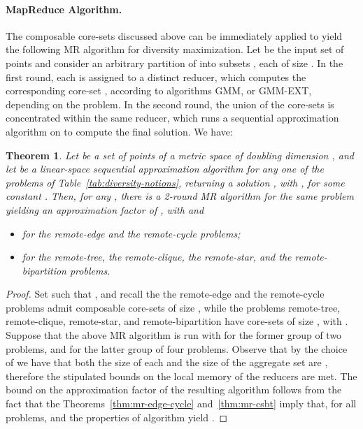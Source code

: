 \documentclass{article}
\newtheorem{theorem}{Theorem}
\begin{document}
\paragraph{MapReduce Algorithm.}  The composable core-sets discussed above
can be immediately applied to yield the following MR algorithm
for diversity maximization.  Let  be the input set of  points
and consider an arbitrary partition of  into  subsets , each of size . In the first round, each
 is assigned to a distinct reducer, which computes the
corresponding core-set , according to algorithms {\sc GMM}, or
{\sc GMM-EXT}, depending on the problem. In the second round, the
union of the  core-sets  is
concentrated within the same reducer, which runs a sequential
approximation algorithm on  to compute the final solution.
We have:
\begin{theorem} \label{thm-2-rounds} Let  be a set of  points of
  a metric space of doubling dimension , and let  be a
  linear-space sequential approximation algorithm for any one of the
  problems of Table~\ref{tab:diversity-notions}, returning a solution
  , with ,
  for some constant . Then, for any
  , there is a 2-round MR algorithm for the same
  problem yielding an approximation factor of , with
   and
  \begin{itemize}
  \item  for the remote-edge
    and the remote-cycle problems;
  \item  for the remote-tree,
    the remote-clique, the remote-star, and the remote-bipartition
    problems.
  \end{itemize}
\end{theorem}
\begin{proof}
Set  such that , and
recall the the remote-edge and the remote-cycle problems admit
composable core-sets of size , while the problems
remote-tree, remote-clique, remote-star, and remote-bipartition have
core-sets of size , with .  Suppose that
the above MR algorithm is run with  for the former
group of two problems, and  for the latter
group of four problems.  Observe that by the choice of  we have
that both the size of each  and the size of the aggregate set
 are , therefore the stipulated bounds on the local
memory of the reducers are met. The bound on the approximation factor
of the resulting algorithm follows from the fact that the
Theorems~\ref{thm:mr-edge-cycle} and~\ref{thm:mr-csbt} imply that, for
all problems,  and the properties of algorithm
 yield .
\end{proof}
\end{document}
